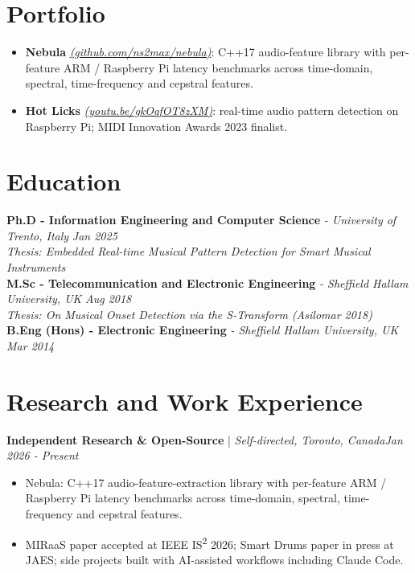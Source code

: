 \documentclass[11pt]{article}
\newenvironment{cvrole}[5]{%
  \par\noindent\textbf{\large #1} | \textit{\small #2, #3}\hfill \textit{\small #4 - #5}\par
  \begin{itemize}[leftmargin=2em, itemsep=-0.3em, topsep=-0.5em]%
}{%
  \end{itemize}\par\noindent\mbox{}\par\vspace{0.1em}%
}
\begin{document}
\section*{Portfolio \footnotesize {}}
\begin{itemize}[leftmargin=1.2em, itemsep=-0.25em]
    \item \textbf{Nebula} \href{https://github.com/ns2max/nebula}{\textit{(github.com/ns2max/nebula)}}: C++17 audio-feature library with per-feature ARM / Raspberry Pi latency benchmarks across time-domain, spectral, time-frequency and cepstral features.
    \item \textbf{Hot Licks} \href{https://youtu.be/gkOqfOT8zXM}{\textit{(youtu.be/gkOqfOT8zXM)}}: real-time audio pattern detection on Raspberry Pi; MIDI Innovation Awards 2023 finalist.
\end{itemize}

\section*{Education}
\textbf{Ph.D - Information Engineering and Computer Science} \textit{\small{ - University of Trento, Italy}} \hfill \textit{Jan 2025}\\[2pt]
\noindent\textit{\small Thesis: Embedded Real-time Musical Pattern Detection for Smart Musical Instruments}\\[3pt]
\noindent\textbf{M.Sc - Telecommunication and Electronic Engineering} \textit{\small{ - Sheffield Hallam University, UK}} \hfill \textit{Aug 2018}\\[2pt]
\noindent\textit{\small Thesis: On Musical Onset Detection via the S-Transform (Asilomar 2018)}\\[3pt]
\noindent\textbf{B.Eng (Hons) - Electronic Engineering} \textit{\small{ - Sheffield Hallam University, UK}} \hfill \textit{Mar 2014}

\section*{Research and Work Experience}

\begin{cvrole}{Independent Research \& Open-Source}{Self-directed}{Toronto, Canada}{Jan 2026}{Present}
    \item Nebula: C++17 audio-feature-extraction library with per-feature ARM / Raspberry Pi latency benchmarks across time-domain, spectral, time-frequency and cepstral features.
    \item MIRaaS paper accepted at IEEE IS\textsuperscript{2} 2026; Smart Drums paper in press at JAES; side projects built with AI-assisted workflows including Claude Code.
\end{cvrole}
\end{document}
